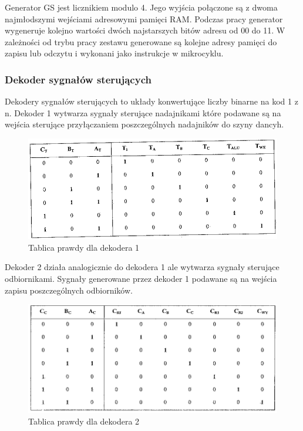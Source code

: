 \documentclass[../main.tex]{subfiles}
\begin{document}
        Generator GS jest licznikiem modulo 4. Jego wyjścia połączone są z dwoma najmłodszymi wejściami adresowymi pamięci RAM. Podczas pracy
        generator wygeneruje kolejno wartości dwóch najstarszych bitów adresu od 00 do 11. W zależności od trybu pracy zestawu generowane są
        kolejne adresy pamięci do zapisu lub odczytu i wykonani jako instrukcje w mikrocyklu.

        \subsubsection*{Dekoder sygnałów sterujących}
        
        Dekodery sygnałów sterujących to układy konwertujące liczby binarne na kod 1 z n. Dekoder 1 wytwarza sygnały sterujące nadajnikami które
        podawane są na wejścia sterujące przyłączaniem poszczególnych nadajników do szyny dancyh.

        \begin{figure}[H]
            \centering
            \includegraphics[width=\linewidth]{nadajniki.png}
            \caption{Tablica prawdy dla dekodera 1}
            \label{fig:nadajniki}
        \end{figure}

        Dekoder 2 działa analogicznie do dekodera 1 ale wytwarza sygnały sterujące odbiornikami. Sygnały generowane przez dekoder 1 podawane
        są na wejścia zapisu poszczególnych odbiorników.

        \begin{figure}[H]
            \centering
            \includegraphics[width=\linewidth]{odbiorniki.png}
            \caption{Tablica prawdy dla dekodera 2}
            \label{fig:odbiorniki}
        \end{figure}
\end{document}
